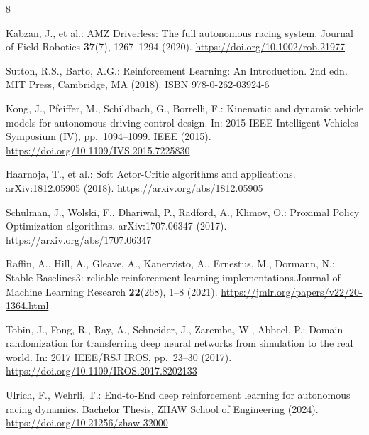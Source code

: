 \documentclass[runningheads]{llncs}
\providecommand{\doi}[1]{\url{https://doi.org/#1}}
\begin{document}
\begin{thebibliography}{8}\small

Kabzan, J., et al.: AMZ Driverless: The full autonomous racing system. Journal of Field Robotics \textbf{37}(7), 1267--1294 (2020). \doi{10.1002/rob.21977}

Sutton, R.S., Barto, A.G.: Reinforcement Learning: An Introduction. 2nd edn. MIT Press, Cambridge, MA (2018). ISBN 978-0-262-03924-6

Kong, J., Pfeiffer, M., Schildbach, G., Borrelli, F.: Kinematic and dynamic vehicle models for autonomous driving control design. In: 2015 IEEE Intelligent Vehicles Symposium (IV), pp.~1094--1099. IEEE (2015). \doi{10.1109/IVS.2015.7225830}

Haarnoja, T., et al.: Soft Actor-Critic algorithms and applications. arXiv:1812.05905 (2018). \url{https://arxiv.org/abs/1812.05905}

Schulman, J., Wolski, F., Dhariwal, P., Radford, A., Klimov, O.: Proximal Policy Optimization algorithms. arXiv:1707.06347 (2017). \url{https://arxiv.org/abs/1707.06347}

Raffin, A., Hill, A., Gleave, A., Kanervisto, A., Ernestus, M., Dormann, N.: Stable-Baselines3: reliable reinforcement learning implementations.Journal of Machine Learning Research \textbf{22}(268), 1--8 (2021). \url{https://jmlr.org/papers/v22/20-1364.html}

Tobin, J., Fong, R., Ray, A., Schneider, J., Zaremba, W., Abbeel, P.: Domain randomization for transferring deep neural networks from simulation to the real world. In: 2017 IEEE/RSJ IROS, pp.~23--30 (2017). \doi{10.1109/IROS.2017.8202133}

Ulrich, F., Wehrli, T.: End-to-End deep reinforcement learning for autonomous racing dynamics. Bachelor Thesis, ZHAW School of Engineering (2024). \url{https://doi.org/10.21256/zhaw-32000}

\end{thebibliography}
\end{document}
